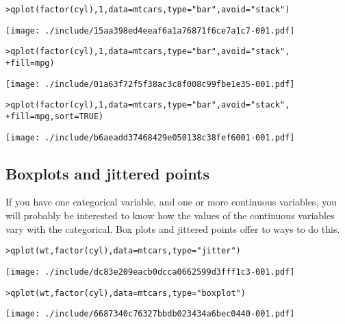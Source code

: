 \begin{alltt}
> qplot(factor(cyl), 1, data = mtcars, type = "bar", avoid = "stack")
\end{alltt}
\texttt{[image: ./include/15aa398ed4eeaf6a1a76871f6ce7a1c7-001.pdf]}
\begin{alltt}

> qplot(factor(cyl), 1, data = mtcars, type = "bar", avoid = "stack", 
+     fill = mpg)
\end{alltt}
\texttt{[image: ./include/01a63f72f5f38ac3c8f008c99fbe1e35-001.pdf]}
\begin{alltt}

> qplot(factor(cyl), 1, data = mtcars, type = "bar", avoid = "stack", 
+     fill = mpg, sort = TRUE)
\end{alltt}
\texttt{[image: ./include/b6aeadd37468429e050138c38fef6001-001.pdf]}
\begin{alltt}

\end{alltt}

\subsection{Boxplots and jittered points}\label{sub:boxplot}

If you have one categorical variable, and one or more continuous variables, you will probably be interested to know how the values of the continuous variables vary with the categorical.  Box plots and jittered points offer to ways to do this.  

\begin{alltt}
> qplot(wt, factor(cyl), data = mtcars, type = "jitter")
\end{alltt}
\texttt{[image: ./include/dc83e209eacb0dcca0662599d3fff1c3-001.pdf]}
\begin{alltt}

> qplot(wt, factor(cyl), data = mtcars, type = "boxplot")
\end{alltt}
\texttt{[image: ./include/6687340c76327bbdb023434a6bec0440-001.pdf]}
\begin{alltt}

\end{alltt}

